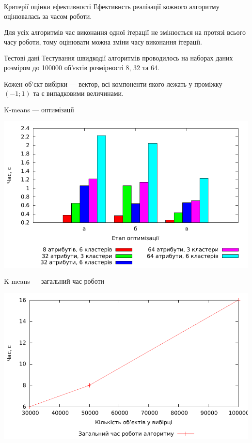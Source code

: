 \documentclass{beamer}
\begin{document}
    
    \begin{frame}{Критерії оцінки ефективності}
        Ефективнсть реалізації кожного алгоритму оцінювалась за часом роботи.
        
        Для усіх алгоритмів час виконання одної ітерації не змінюється на протязі всього часу роботи, тому оцінювати можна зміни часу виконання ітерації.
    \end{frame}
    
    
    \begin{frame}{Тестові дані}
        Тестування швидкодії алгоритмів проводилось на наборах даних розміром до 100000 об’єктів розмірності 8, 32 та 64.
        
        Кожен об’єкт вибірки --- вектор, всі компоненти якого лежать у проміжку $(-1; 1)$ та є випадковими величинами.
    \end{frame}
    
    
    \begin{frame}{K-means --- оптимізації}
        \begin{center}
            \includegraphics[scale=0.8]{kmeans_iteration_average.pdf}
        \end{center}
    \end{frame}
    
    
    \begin{frame}{K-means --- загальний час роботи}
        \begin{center}
            \includegraphics[scale=0.8]{kmeans_complexity.pdf}
        \end{center}
    \end{frame}
    
\end{document}
